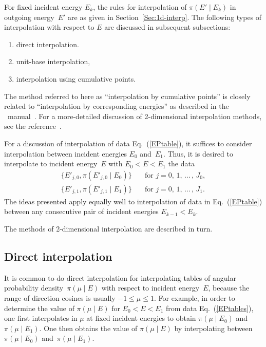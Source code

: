 For fixed incident energy $E_k$, the rules for interpolation of 
$\pi(E' \mid E_k )$ in outgoing energy~$E'$ are as given
in Section~\ref{Sec:1d-interp}.  The following types
of interpolation with respect to $E$ are discussed in subsequent subsections:
\begin{enumerate}
 \item direct interpolation.
 \item unit-base interpolation,
 \item interpolation using cumulative points.
\end{enumerate}

The method referred to here as ``interpolation by cumulative points''
is closely related to ``interpolation by corresponding energies'' as described
in the \ENDF\ manual~\cite{ENDFB}.  
For a more-detailed discussion of 2-dimensional interpolation methods,
see the reference~\cite{interpolation}.

For a discussion of interpolation of data Eq.~(\ref{EPtable}), it suffices
to consider interpolation between incident energies $E_0$ and~$E_1$.
Thus, it is desired to interpolate to incident energy~$E$ with
$E_0 < E < E_1$ the data
\begin{equation}
\begin{split}
  \{ E'_{j,0}, \pi(E'_{j,0} \mid E_0 )\} &\quad \text{for $j = 0$, 1, $\ldots\,$, $J_0$}, \\
  \{ E'_{j,1}, \pi(E'_{j,1} \mid E_1 )\} &\quad \text{for $j = 0$, 1, $\ldots\,$, $J_1$}.
  \label{EPtables}
\end{split}
\end{equation}
The ideas presented apply equally well to interpolation of data
in Eq.~(\ref{EPtable}) between any consecutive pair of
incident energies $E_{k-1} < E_k$.

The methods of 2-dimensional interpolation are described in turn.

\subsection{Direct interpolation}\label{Sec:direct-interp}
It is common to do direct interpolation for interpolating tables of angular probability
density~$\pi( \mu \mid E)$ with respect to incident energy~$E$, because the
range of direction cosines is usually $-1 \le \mu \le 1$.  For example, in order
to determine the value of $\pi( \mu \mid E)$ for $E_0 < E < E_1$ from data
Eq.~(\ref{EPtables}), one first interpolates in $\mu$
at fixed incident energies to obtain $\pi( \mu \mid E_0)$ and~$\pi( \mu \mid E_1)$.
One then obtains the value of $\pi( \mu \mid E)$ by interpolating between
$\pi( \mu \mid E_0)$ and~$\pi( \mu \mid E_1)$.

